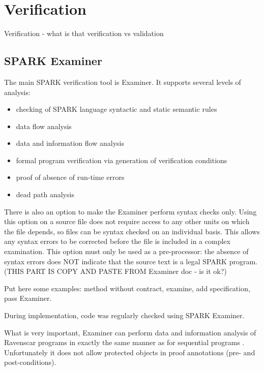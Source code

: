 
\cleardoublepage

\chapter{Verification}
\label{verification}

Verification - what is that
verification vs validation



\section{SPARK Examiner}
\label{verification:examiner}

The main SPARK verification tool is Examiner. It supports several levels of analysis:
\begin{itemize}
	\item checking of SPARK language syntactic and static semantic rules
	\item data flow analysis
	\item data and information flow analysis
	\item formal program verification via generation of verification conditions
	\item proof of absence of run-time errors
	\item dead path analysis
\end{itemize}

There is also an option to make the Examiner perform syntax checks only. Using this option on a source file does not require access to any other units on which the file depends, so files can be syntax checked on an individual basis. This allows any syntax errors to be corrected before the file is included in a complex examination.  This option must only be used as a pre-processor: the absence of syntax errors does NOT indicate that the source text is a legal SPARK program. \cite{Examiner:Online} (THIS PART IS COPY AND PASTE FROM Examiner doc - is it ok?)

Put here some examples: method without contract, examine, add specification, pass Examiner.

During implementation, code was regularly checked using SPARK Examiner.

What is very important, Examiner can perform data and information analysis of Ravenscar programs in exactly the same manner as for sequential programs \cite{Ravenscar:Online}. Unfortunately it does not allow protected objects in proof annotations (pre- and post-conditions).

